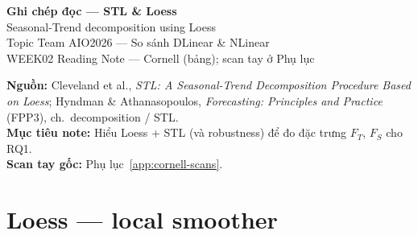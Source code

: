 \documentclass[12pt,a4paper]{article}
\begin{document}
\begin{center}
  {\LARGE\bfseries Ghi chép đọc --- STL \& Loess}\\[0.35em]
  {\large Seasonal-Trend decomposition using Loess}\\[0.5em]
  {\normalsize Topic Team AIO2026 --- So sánh DLinear \& NLinear}\\[0.25em]
  {\small WEEK02 Reading Note --- Cornell (bảng); scan tay ở Phụ lục}
\end{center}

\vspace{0.5em}
\noindent\textbf{Nguồn:} Cleveland et al., \textit{STL: A Seasonal-Trend Decomposition Procedure Based on Loess};
Hyndman \& Athanasopoulos, \textit{Forecasting: Principles and Practice} (FPP3), ch.\ decomposition / STL.\\
\noindent\textbf{Mục tiêu note:} Hiểu Loess + STL (và robustness) để đo đặc trưng \(F_T\), \(F_S\) cho RQ1.\\
\noindent\textbf{Scan tay gốc:} Phụ lục~\ref{app:cornell-scans}.

\section{Loess --- local smoother}
\end{document}
